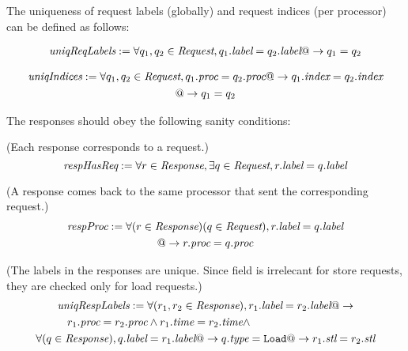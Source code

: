 The uniqueness of request labels (globally) and request indices (per processor) can be defined as follows:
\begin{defn}
\begin{multline*}
\textit{uniqReqLabels} := \forall q_1, q_2\in\textit{Request}, q_1.\textit{label} = q_2.\textit{label} @-> q_1 = q_2\\
\end{multline*}
\end{defn}
\begin{defn}
\begin{multline*}
\textit{uniqIndices} := \forall q_1, q_2\in\textit{Request},
     q_1.\textit{proc} = q_2.\textit{proc} @-> q_1.\textit{index} = q_2.\textit{index} \\ @-> q_1 = q_2
\end{multline*}
\end{defn}

The responses should obey the following sanity conditions:
\begin{defn} (Each response corresponds to a request.)
\begin{equation*}
\textit{respHasReq} := \forall r\in\textit{Response}, \exists q\in\textit{Request}, r.\textit{label} = q.\textit{label}
\end{equation*}
\end{defn}

\begin{defn} (A response comes back to the same processor that sent the corresponding request.)
\begin{multline*}
\textit{respProc} := \forall (r\in\textit{Response}) (q\in\textit{Request}), r.\textit{label} = q.\textit{label} \\ @-> r.\textit{proc} = q.\textit{proc}
\end{multline*}
\newline
\end{defn}

\begin{defn} (The labels in the responses are unique. Since \stl{} field is irrelecant for
store requests, they are checked only for load requests.)
\begin{multline*}
\textit{uniqRespLabels} := \forall (r_1, r_2 \in \Response), r_1.\mylabel = r_2.\mylabel @-> \\
\hspace{1cm} r_1.\proc = r_2.\proc \wedge r_1.\mytime = r_2.\mytime \wedge \hfill \\
\forall (q \in \Response), q.\mylabel = r_1.\mylabel @->
q.\desc = \Ld @-> r_1.\stl = r_2.\stl
\end{multline*}
\end{defn}

